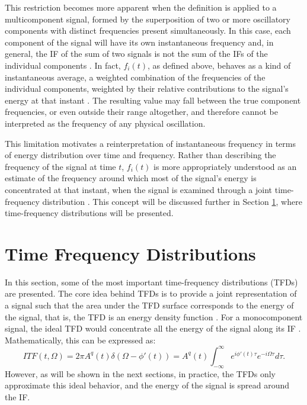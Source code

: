 This restriction becomes more apparent when the definition is applied to a multicomponent signal, formed by the superposition of two or more oscillatory components with distinct frequencies present simultaneously. In this case, each component of the signal will have its own instantaneous frequency and, in general, the IF of the sum of two signals is not the sum of the IFs of the individual components \cite{Boashash2016Chapter1TimeFrequency}. In fact, $f_i(t)$, as defined above, behaves as a kind of instantaneous average, a weighted combination of the frequencies of the individual components, weighted by their relative contributions to the signal's energy at that instant \cite{cohen1988instantaneous,boashash1992estimating}. The resulting value may fall between the true component frequencies, or even outside their range altogether, and therefore cannot be interpreted as the frequency of any physical oscillation.

This limitation motivates a reinterpretation of instantaneous frequency in terms of energy distribution over time and frequency. Rather than describing the frequency of the signal at time $t$, $f_i(t)$ is more appropriately understood as an estimate of the frequency around which most of the signal's energy is concentrated at that instant, when the signal is examined through a joint time-frequency distribution \cite{stankovic2014instantaneous}. This concept will be discussed further in Section \ref{sec-tfd}, where time-frequency distributions will be presented.


\section{Time Frequency Distributions} \label{sec-tfd}

In this section, some of the most important time-frequency distributions (TFDs) are presented. The core idea behind TFDs is to provide a joint representation of a signal such that the area under the TFD surface corresponds to the energy of the signal, that is, the TFD is an energy density function \cite{Boashash2016Chapter2HeuristicFormulation}. For a monocomponent signal, the ideal TFD would concentrate all the energy of the signal along its IF \cite{stankovic1995analysis}. Mathematically, this can be expressed as:
\begin{equation}
    ITF(t, \Omega) = 2\pi A^q(t) \delta(\Omega - \phi'(t)) = A^q(t) \int_{-\infty}^{\infty} e^{i\phi'(t) \tau} e^{-i\Omega \tau} d\tau.
    \label{eq:ITF}
\end{equation}
However, as will be shown in the next sections, in practice, the TFDs only approximate this ideal behavior, and the energy of the signal is spread around the IF.

